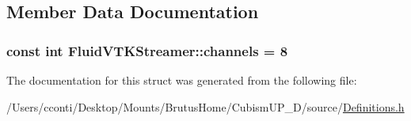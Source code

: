 \subsection{Member Data Documentation}
\hypertarget{struct_fluid_v_t_k_streamer_adcb0db4a89f427581c00828b0029f6b1}{}
\subsubsection[{channels}]{\setlength{\rightskip}{0pt plus 5cm}const int Fluid\+V\+T\+K\+Streamer\+::channels = 8\hspace{0.3cm}{\ttfamily [static]}}\label{struct_fluid_v_t_k_streamer_adcb0db4a89f427581c00828b0029f6b1}


The documentation for this struct was generated from the following file\+:\begin{DoxyCompactItemize}
\item 
/\+Users/cconti/\+Desktop/\+Mounts/\+Brutus\+Home/\+Cubism\+U\+P\+\_\+D/source/\hyperlink{_definitions_8h}{Definitions.\+h}\end{DoxyCompactItemize}

